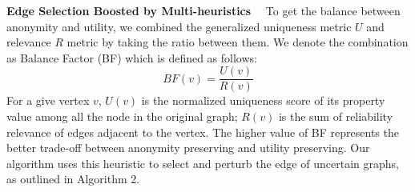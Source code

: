
\textbf{Edge Selection Boosted by Multi-heuristics}~~
To get the balance between anonymity and utility, we combined the generalized uniqueness metric $U$ and relevance $R$ metric by taking the ratio between them. 
We denote the combination as Balance Factor (BF) which is defined as follows:
\begin{equation*}
    BF(v)=\frac{U(v)}{R(v)}
\end{equation*}
For a give vertex $v$, $U(v)$ is the normalized uniqueness score of its property value among all the node in the original graph; $R(v)$ is the sum of reliability relevance of edges adjacent to the vertex. 
The higher value of BF represents the better trade-off between anonymity preserving and utility preserving. 
Our algorithm uses this heuristic to select and perturb the edge of uncertain graphs, as outlined in Algorithm 2. 




